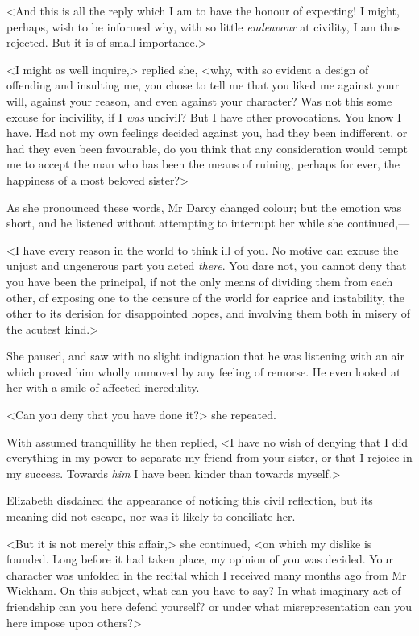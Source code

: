 <And this is all the reply which I am to have the honour of expecting! I might, perhaps, wish to be informed why, with so little \textit{endeavour} at civility, I am thus rejected. But it is of small importance.>

<I might as well inquire,> replied she, <why, with so evident a design of offending and insulting me, you chose to tell me that you liked me against your will, against your reason, and even against your character? Was not this some excuse for incivility, if I \textit{was} uncivil? But I have other provocations. You know I have. Had not my own feelings decided against you, had they been indifferent, or had they even been favourable, do you think that any consideration would tempt me to accept the man who has been the means of ruining, perhaps for ever, the happiness of a most beloved sister?>

As she pronounced these words, Mr Darcy changed colour; but the emotion was short, and he listened without attempting to interrupt her while she continued,—

<I have every reason in the world to think ill of you. No motive can excuse the unjust and ungenerous part you acted \textit{there}. You dare not, you cannot deny that you have been the principal, if not the only means of dividing them from each other, of exposing one to the censure of the world for caprice and instability, the other to its derision for disappointed hopes, and involving them both in misery of the acutest kind.>

She paused, and saw with no slight indignation that he was listening with an air which proved him wholly unmoved by any feeling of remorse. He even looked at her with a smile of affected incredulity.

<Can you deny that you have done it?> she repeated.

With assumed tranquillity he then replied, <I have no wish of denying that I did everything in my power to separate my friend from your sister, or that I rejoice in my success. Towards \textit{him} I have been kinder than towards myself.>

Elizabeth disdained the appearance of noticing this civil reflection, but its meaning did not escape, nor was it likely to conciliate her.

<But it is not merely this affair,> she continued, <on which my dislike is founded. Long before it had taken place, my opinion of you was decided. Your character was unfolded in the recital which I received many months ago from Mr Wickham. On this subject, what can you have to say? In what imaginary act of friendship can you here defend yourself? or under what misrepresentation can you here impose upon others?>

